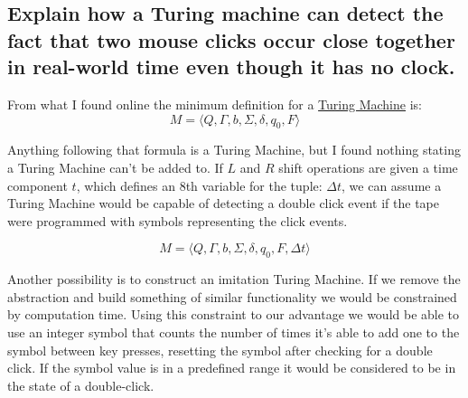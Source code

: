 \documentclass{article}
\begin{document}
\subsection[Turing Machine Double Click]{Explain how a Turing machine can 
detect the fact that two mouse clicks occur close together in real-world time 
even though it has no clock.}

From what I found online the minimum definition for a 
\href{https://en.wikipedia.org/wiki/Turing_machine#Formal_definition}
{Turing Machine} is:
$$M = \langle Q, \Gamma, b, \Sigma, \delta, q_0, F \rangle$$

Anything following that formula is a Turing Machine, but I found nothing 
stating a Turing Machine can't be added to. If $L$ and $R$ shift operations are 
given a time component $t$, which defines an 8th variable for the tuple: 
$\Delta t$, we can assume a Turing Machine would be capable of detecting a double 
click event if the tape were programmed with symbols representing the click 
events.

$$M = \langle Q, \Gamma, b, \Sigma, \delta, q_0, F, \Delta t \rangle$$

Another possibility is to construct an imitation Turing Machine. If we remove 
the abstraction and build something of similar functionality we would be 
constrained by computation time. Using this constraint to our advantage we would 
be able to use an integer symbol that counts the number of times it's able to 
add one to the symbol between key presses, resetting the symbol after checking 
for a double click. If the symbol value is in a predefined range it would be 
considered to be in the state of a double-click.
\end{document}
